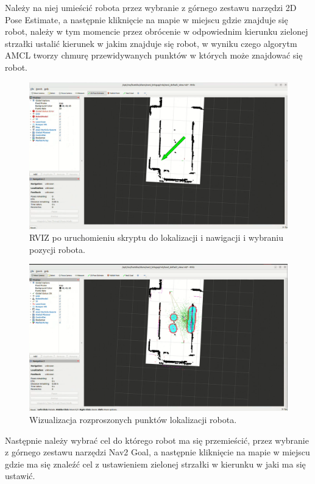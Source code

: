 \documentclass[a4paper,twoside,12pt]{book}
\begin{document}
Należy na niej umieścić robota przez wybranie z górnego zestawu narzędzi 2D Pose Estimate, a następnie kliknięcie na mapie w miejscu gdzie znajduje się robot, należy w tym momencie przez obrócenie w odpowiednim kierunku zielonej strzałki ustalić kierunek w jakim znajduje się robot,
 w wyniku czego algorytm AMCL tworzy chmurę przewidywanych punktów w których może znajdować się robot.
\begin{figure}[!hb]
	\centering
	\includegraphics[width=1\textwidth]{images/launch-nav.png}
	\caption{RVIZ po uruchomieniu skryptu do lokalizacji i nawigacji i wybraniu pozycji robota.}
	\label{fig:nav-map}
\end{figure}
\newpage
\begin{figure}[!hb]
	\centering
	\includegraphics[width=1\textwidth]{images/launch-nav2.png}
	\caption{Wizualizacja rozproszonych punktów lokalizacji robota.}
	\label{fig:nav-map2}
\end{figure}
\newpage
Następnie należy wybrać cel do którego robot ma się przemieścić, przez wybranie z górnego zestawu narzędzi Nav2 Goal, a następnie kliknięcie na mapie w miejscu gdzie ma się znaleźć cel z ustawieniem zielonej strzałki w kierunku w jaki ma się ustawić.
\end{document}
